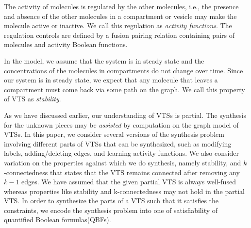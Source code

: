 %
The activity of molecules is regulated by the other molecules, i.e.,
the presence and absence of the other molecules in a compartment or
vesicle may make the molecule active or inactive.
%
We call this regulation as {\em activity functions}.
%
%
%
%
The regulation controls are defined by a fusion pairing relation
containing pairs of molecules and activity
Boolean functions.

%
In the model, we assume that the system is in steady state and the
concentrations of the molecules in compartments do not change over
time.
%
Since our system is in steady state, we expect that any molecule that
leaves a compartment must come back via some path on the graph.
%
We call this property of VTS as {\em stability}.

%
As we have discussed earlier, our understanding of VTSs is partial.
%
%
%
%
The synthesis for the unknown pieces may be {\em assisted} by computation on
the graph model of VTSs.
%
In this paper, we consider several versions of the synthesis problem
involving different parts of VTSs that can be synthesized, such as
modifying labels, adding/deleting edges, and learning activity functions.
%
We also consider variation on the properties against which we do
synthesis, namely stability, and $k$-connectedness that states that the VTS remains connected after removing any $k-1$ edges.
%
We have assumed that the given partial VTS is always well-fused whereas properties like stability and k-connectedness may not hold in the partial VTS.
%
In order to synthesize the parts of a VTS such that it satisfies the
constraints, we encode the synthesis problem into one of satisfiability of
quantified Boolean formulas(QBFs). 
%

